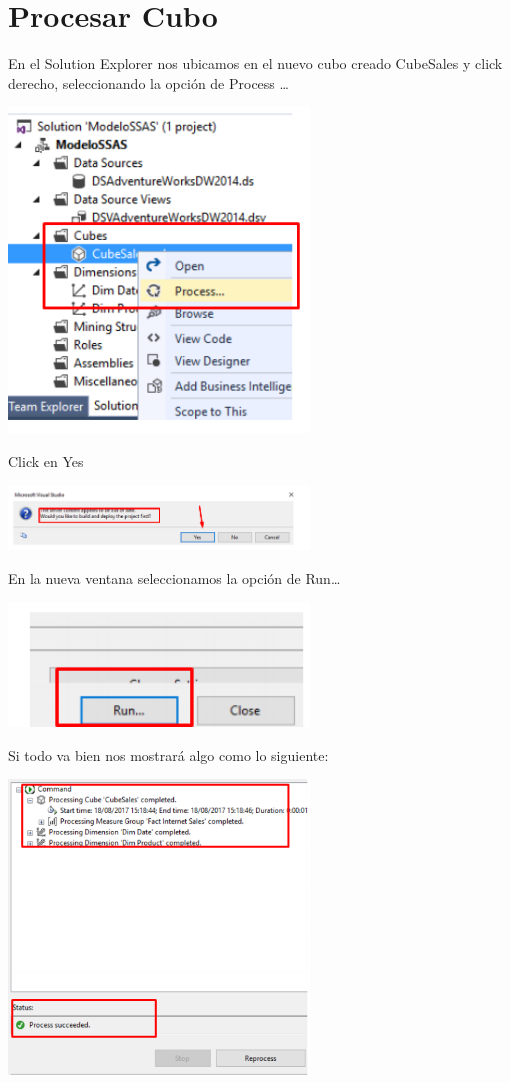 \section{Procesar Cubo} 
En el Solution Explorer nos ubicamos en el nuevo cubo creado CubeSales y click derecho, seleccionando la
opción de Process …

	\begin{center}
	\includegraphics[width=8cm]{images/task4/img22}
	\end{center}	
	Click en Yes
	\begin{center}
	\includegraphics[width=8cm]{images/task4/img23}
	\end{center}	
En la nueva ventana seleccionamos la opción de Run…
	\begin{center}
	\includegraphics[width=8cm]{images/task4/img24}
	\end{center}	
Si todo va bien nos mostrará algo como lo siguiente:
	\begin{center}
	\includegraphics[width=8cm]{images/task4/img25}
	\end{center}	
